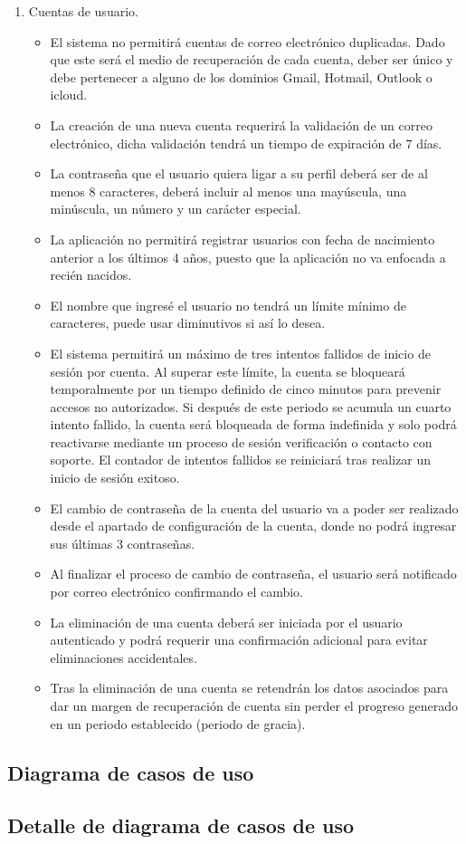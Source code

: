 \documentclass[letterpaper,12pt,oneside]{article}
\begin{document}
            \begin{enumerate}
                \item Cuentas de usuario.
                \begin{itemize}
                    \item El sistema no permitirá cuentas de correo electrónico duplicadas. Dado que este será el medio de recuperación de cada cuenta, deber ser único y debe pertenecer a alguno de los dominios Gmail, Hotmail, Outlook o icloud.
                    \item La creación de una nueva cuenta requerirá la validación de un correo electrónico, dicha validación tendrá un tiempo de expiración de 7 días.
                    \item La contraseña que el usuario quiera ligar a su perfil deberá ser de al menos 8 caracteres, deberá incluir al menos una mayúscula, una minúscula, un número y un carácter especial.
                    \item La aplicación no permitirá registrar usuarios con fecha de nacimiento anterior a los últimos 4 años, puesto que la aplicación no va enfocada a recién nacidos.
                    \item El nombre que ingresé el usuario no tendrá un límite mínimo de caracteres, puede usar diminutivos si así lo desea.
                    \item El sistema permitirá un máximo de tres intentos fallidos de inicio de sesión por cuenta. Al superar este límite, la cuenta se bloqueará temporalmente por un tiempo definido de cinco minutos para prevenir accesos no autorizados. Si después de este periodo se acumula un cuarto intento fallido, la cuenta será bloqueada de forma indefinida y solo podrá reactivarse mediante un proceso de sesión verificación o contacto con soporte. El contador de intentos fallidos se reiniciará tras realizar un inicio de sesión exitoso.
                    \item El cambio de contraseña de la cuenta del usuario va a poder ser realizado desde el apartado de configuración de la cuenta, donde no podrá ingresar sus últimas 3 contraseñas.
                    \item Al finalizar el proceso de cambio de contraseña, el usuario será notificado por correo electrónico confirmando el cambio.
                    \item La eliminación de una cuenta deberá ser iniciada por el usuario autenticado y podrá requerir una confirmación adicional para evitar eliminaciones accidentales.
                    \item Tras la eliminación de una cuenta se retendrán los datos asociados para dar un margen de recuperación de cuenta sin perder el progreso generado en un periodo establecido (periodo de gracia).
                \end{itemize}
            \end{enumerate}
        \subsection{Diagrama de casos de uso}
        \subsection{Detalle de diagrama de casos de uso}
\end{document}
